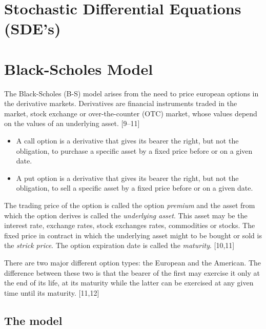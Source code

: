 \documentclass[12pt,twoside]{reedthesis}
\theoremstyle{definition}
\theoremstyle{definition}
\theoremstyle{remark}
\begin{document}
  \section{Stochastic Differential Equations
  (SDE's)}\label{stochastic-differential-equations-sdes}
  
  \section{Black-Scholes Model}\label{black-scholes-model}
  
  The Black-Scholes (B-S) model arises from the need to price european
  options in the derivative markets. Derivatives are financial instruments
  traded in the market, stock exchange or over-the-counter (OTC) market,
  whose values depend on the values of an underlying asset. {[}9--11{]}
  \begin{itemize}
  \item
    A call option is a derivative that gives its bearer the right, but not
    the obligation, to purchase a specific asset by a fixed price before
    or on a given date.
  \item
    A put option is a derivative that gives its bearer the right, but not
    the obligation, to sell a specific asset by a fixed price before or on
    a given date.
  \end{itemize}
  The trading price of the option is called the option \emph{premium} and
  the asset from which the option derives is called the \emph{underlying
  asset}. This asset may be the interest rate, exchange rates, stock
  exchanges rates, commodities or stocks. The fixed price in contract in
  which the underlying asset might to be bought or sold is the
  \emph{strick price}. The option expiration date is called the
  \emph{maturity}. {[}10,11{]}
  
  There are two major different option types: the European and the
  American. The difference between these two is that the bearer of the
  first may exercise it only at the end of its life, at its maturity while
  the latter can be exercised at any given time until its maturity.
  {[}11,12{]}
  
  \subsection{The model}\label{the-model}
  
\end{document}

